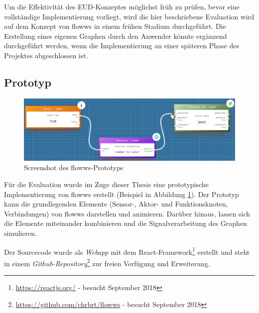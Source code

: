 Um die Effektivität des \ac{EUD}-Konzeptes möglichst früh zu prüfen, bevor eine vollständige Implementierung vorliegt, wird die hier beschriebene Evaluation wird auf dem Konzept von flowws in einem frühen Stadium durchgeführt. Die Erstellung eines eigenen Graphen durch den Anwender könnte ergänzend durchgeführt werden, wenn die Implementierung an einer späteren Phase des Projektes abgeschlossen ist. 

\subsection{Prototyp}

\begin{figure}[h]
  \centering
  \includegraphics[width=1\textwidth]{bilder/chapter5/screenshotflows.pdf}
  \caption{Screenshot des flowws-Prototyps}
  \label{fig:flowwsprototyp}
\end{figure}

Für die Evaluation wurde im Zuge dieser Thesis eine prototypische Implementierung von flowws erstellt (Beispiel in Abbildung \ref{fig:flowwsprototyp}). Der Prototyp kann die grundlegenden Elemente (Sensor-, Aktor- und Funktionsknoten, Verbindungen) von flowws darstellen und animieren. Darüber hinaus, lassen sich die Elemente miteinander kombinieren und die Signalverarbeitung des Graphen simulieren.

Der Sourcecode wurde als \textit{Webapp} mit dem React-Framework\footnote{\url{https://reactjs.org/} - besucht September 2018} erstellt und steht in einem \textit{Github-Repository}\footnote{\url{https://github.com/chrbrt/flowws} - besucht September 2018} zur freien Verfügung und Erweiterung.
